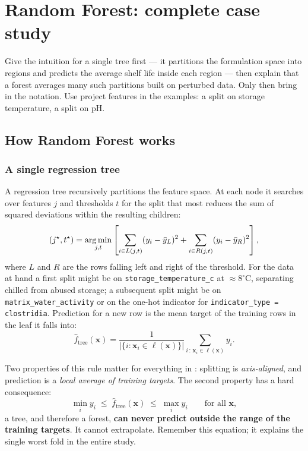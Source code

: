 \chapter{Random Forest: complete case study}
\label{ch:rf}

\begin{saybox}[title=What to say at the start of this section]
Give the intuition for a single tree first --- it partitions the
formulation space into regions and predicts the average shelf life inside
each region --- then explain that a forest averages many such partitions
built on perturbed data. Only then bring in the notation. Use project
features in the examples: a split on storage temperature, a split on pH.
\end{saybox}

\section{How Random Forest works}

\subsection{A single regression tree}

A regression tree recursively partitions the feature space. At each node
it searches over features $j$ and thresholds $t$ for the split that most
reduces the sum of squared deviations within the resulting children:
\begin{equation}
(j^\star, t^\star) = \operatorname*{arg\,min}_{j, t}
\left[
\sum_{i \in L(j,t)} (y_i - \bar{y}_{L})^2
+
\sum_{i \in R(j,t)} (y_i - \bar{y}_{R})^2
\right],
\end{equation}
where $L$ and $R$ are the rows falling left and right of the threshold.
For the data at hand a first split might be on
\texttt{storage\_temperature\_c} at $\approx 8^\circ$C, separating chilled
from abused storage; a subsequent split might be on
\texttt{matrix\_water\_activity} or on the one-hot indicator for
\texttt{indicator\_type = clostridia}. Prediction for a new row is the mean
target of the training rows in the leaf it falls into:
\begin{equation}
\hat{f}_{\text{tree}}(\mathbf{x}) = \frac{1}{|\{i : \mathbf{x}_i \in \ell(\mathbf{x})\}|}
\sum_{i \,:\, \mathbf{x}_i \in \ell(\mathbf{x})} y_i .
\end{equation}

Two properties of this rule matter for everything in :
splitting is \emph{axis-aligned}, and prediction is a \emph{local average
of training targets}. The second property has a hard consequence:
\begin{equation}
\min_i y_i \;\le\; \hat{f}_{\text{tree}}(\mathbf{x}) \;\le\; \max_i y_i
\qquad \text{for all } \mathbf{x},
\label{eq:rf-bound}
\end{equation}
a tree, and therefore a forest, \textbf{can never predict outside the range
of the training targets}. It cannot extrapolate. Remember this equation;
it explains the single worst fold in the entire study.


